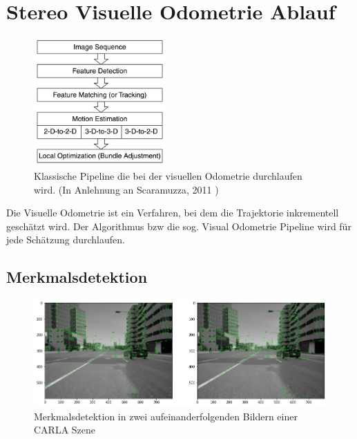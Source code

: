 \section{Stereo Visuelle Odometrie Ablauf}
%
\begin{figure}[!h]
  \begin{center}
    \includegraphics[width=0.45\textwidth]{pictures/vo_pipeline_systementwurf.png}
  \end{center}
  \caption[Visuelle Odometrie Pipeline]{Klassische Pipeline die bei der visuellen Odometrie durchlaufen wird. (In Anlehnung an Scaramuzza, 2011 \cite{ScFrVO})}
\end{figure}
%
Die Visuelle Odometrie ist ein Verfahren, bei dem die Trajektorie inkrementell geschätzt wird. Der Algorithmus bzw die sog. Visual Odometrie Pipeline wird für jede Schätzung durchlaufen.

\subsection{Merkmalsdetektion}

\begin{figure}[h]
  \begin{center}
    \includegraphics[width=\textwidth]{pictures/feature_detection_systementwurf.png}
    \caption[Merkmalsdetektion in einer CARLA Szene]{Merkmalsdetektion in zwei aufeinanderfolgenden Bildern einer CARLA Szene}
  \end{center}
\end{figure}

